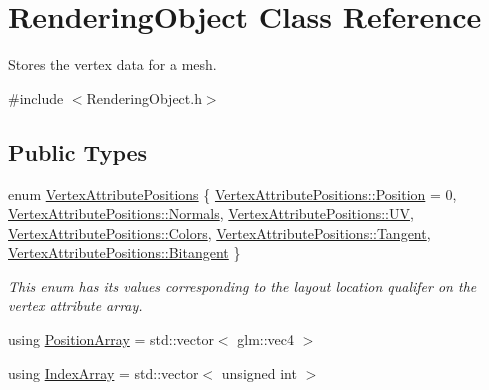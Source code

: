 \hypertarget{class_rendering_object}{}\section{Rendering\+Object Class Reference}
\label{class_rendering_object}


Stores the vertex data for a mesh.  




{\ttfamily \#include $<$Rendering\+Object.\+h$>$}

\subsection*{Public Types}
\begin{DoxyCompactItemize}
\item 
enum \hyperlink{class_rendering_object_ab772f569ef63a1db07db29a744b519ee}{Vertex\+Attribute\+Positions} \{ \newline
\hyperlink{class_rendering_object_ab772f569ef63a1db07db29a744b519eea52f5e0bc3859bc5f5e25130b6c7e8881}{Vertex\+Attribute\+Positions\+::\+Position} = 0, 
\hyperlink{class_rendering_object_ab772f569ef63a1db07db29a744b519eea4ab971a51f0335cbf8d9c2c65d379e99}{Vertex\+Attribute\+Positions\+::\+Normals}, 
\hyperlink{class_rendering_object_ab772f569ef63a1db07db29a744b519eeadeaa2adbeb26802ae61609c3f3642d82}{Vertex\+Attribute\+Positions\+::\+UV}, 
\hyperlink{class_rendering_object_ab772f569ef63a1db07db29a744b519eea5d50889672f6f860d14f502de3de1957}{Vertex\+Attribute\+Positions\+::\+Colors}, 
\newline
\hyperlink{class_rendering_object_ab772f569ef63a1db07db29a744b519eea541671cb1be09d76a84ba1a873ec3fc8}{Vertex\+Attribute\+Positions\+::\+Tangent}, 
\hyperlink{class_rendering_object_ab772f569ef63a1db07db29a744b519eeae3e73a4b6e7cfd12008a35f6a051b319}{Vertex\+Attribute\+Positions\+::\+Bitangent}
 \}\begin{DoxyCompactList}\small\item\em This enum has its values corresponding to the layout location qualifer on the vertex attribute array. \end{DoxyCompactList}
\item 
using \hyperlink{class_rendering_object_a1223b9cf03f2029b9c43d71042c2a18e}{Position\+Array} = std\+::vector$<$ glm\+::vec4 $>$
\item 
using \hyperlink{class_rendering_object_a9931c88bca3384065c6691dfe1e60af1}{Index\+Array} = std\+::vector$<$ unsigned int $>$
\item 

\end{DoxyCompactItemize}
